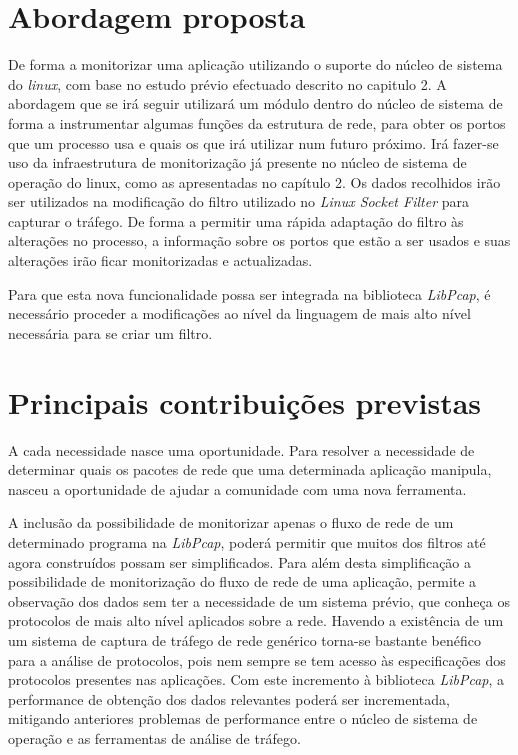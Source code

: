 \section{Abordagem proposta}\label{sec:abordagem_proposta}
De forma a monitorizar uma aplicação utilizando o suporte do núcleo de sistema do \textit{linux}, com base no estudo prévio efectuado descrito no capitulo 2. A abordagem que se irá seguir utilizará um módulo dentro do núcleo de sistema de forma a instrumentar algumas funções da estrutura de rede, para obter os portos que um processo usa e quais os que irá utilizar num futuro próximo. Irá fazer-se uso da infraestrutura de monitorização já presente no núcleo de sistema de operação do linux, como as apresentadas no capítulo 2. Os dados recolhidos irão ser utilizados na modificação do filtro utilizado no \textit{Linux Socket Filter} para capturar o tráfego. De forma a permitir uma rápida adaptação do filtro às alterações no processo, a informação sobre os portos que estão a ser usados e suas alterações irão ficar monitorizadas e actualizadas.

Para que esta nova funcionalidade possa ser integrada na biblioteca \textit{LibPcap}, é necessário proceder a modificações ao nível da linguagem de mais alto nível necessária para se criar um filtro.

\section{Principais contribuições previstas} \label{sect:contribuicoes}


A cada necessidade nasce uma oportunidade. Para resolver a necessidade de determinar quais os pacotes de rede que uma determinada aplicação manipula, nasceu a oportunidade de ajudar a comunidade com uma nova ferramenta.

A inclusão da possibilidade de monitorizar apenas o fluxo de rede de um determinado programa na \textit{LibPcap}, poderá permitir que muitos dos filtros até agora construídos possam ser simplificados. Para além desta simplificação a possibilidade de monitorização do fluxo de rede de uma aplicação, permite a observação dos dados sem ter a necessidade de um sistema prévio, que conheça os protocolos de mais alto nível aplicados sobre a rede. Havendo a existência de um um sistema de captura de tráfego de rede genérico torna-se bastante benéfico para a análise de protocolos, pois nem sempre se tem acesso às especificações dos protocolos presentes nas aplicações. Com este incremento à biblioteca \textit{LibPcap}, a performance de obtenção dos dados relevantes poderá ser incrementada, mitigando anteriores problemas de performance entre o núcleo de sistema de operação e as ferramentas de análise de tráfego.

